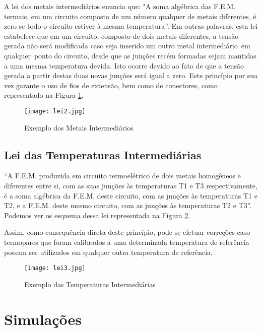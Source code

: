 \documentclass[a4paper,12pt]{report}
\begin{document}
	A lei dos metais intermediários enuncia que: "A soma algébrica das F.E.M. termais, em um circuito composto de um número qualquer de metais diferentes, é zero se todo o circuito estiver à mesma temperatura”. Em outras palavras, esta lei estabelece que em um circuito, composto de dois metais diferentes, a tensão gerada não será modificada caso seja inserido um outro metal intermediário em qualquer ponto do circuito, desde que as junções recém formadas sejam mantidas a uma mesma temperatura devida. Isto ocorre devido ao fato de que a tensão gerada a partir destas duas novas junções será igual a zero. Este princípio por sua vez garante o uso de fios de extensão, bem como de conectores, como  representado na Figura \ref{lei2}.

	\singlespacing
	
	\begin{figure}[htbp]
		\centering
		\texttt{[image: lei2.jpg]}
		\caption{Exemplo dos Metais Intermediários}
		\label{lei2}
	\end{figure}
	

	\subsection{Lei das Temperaturas Intermediárias}

	“A F.E.M. produzida em circuito termoelétrico de dois metais homogêneos e diferentes entre si, com as suas junções às temperaturas T1 e T3 respectivamente, é a soma algébrica da F.E.M. deste circuito, com as junções às temperaturas T1 e T2, e a F.E.M. deste mesmo circuito, com as junções às temperaturas T2 e T3”. Podemos ver os esquema dessa lei representada na Figura \ref{lei3}.
	 
	\singlespacing

	Assim, como consequência direta deste princípio, pode-se efetuar correções caso termopares que foram calibrados a uma determinada temperatura de referência possam ser utilizados em qualquer outra temperatura de referência.

	\begin{figure}[htbp]
		\centering
		\texttt{[image: lei3.jpg]}
		\caption{Exemplo das Temperaturas Intermediárias}
		\label{lei3}
	\end{figure}

	\section{Simulações}
	
\end{document}
